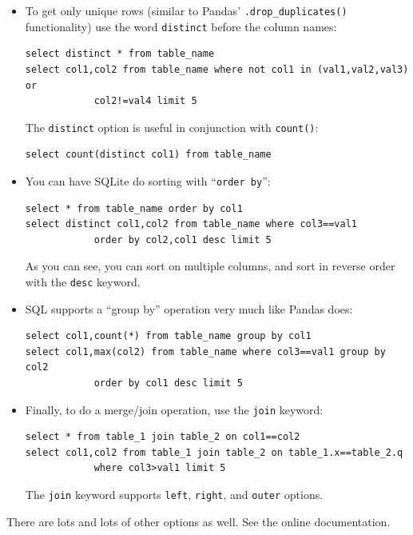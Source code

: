 \begin{itemize}
\item To get only unique rows (similar to Pandas' \texttt{.drop\_duplicates()}
functionality) use the word \texttt{distinct} before the column names:

\scriptsize
\begin{Verbatim}[fontsize=\footnotesize,samepage=true,frame=lines]
select distinct * from table_name
select col1,col2 from table_name where not col1 in (val1,val2,val3) or
            col2!=val4 limit 5
\end{Verbatim}
\normalsize

The \texttt{distinct} option is useful in conjunction with \texttt{count()}:
\scriptsize
\begin{Verbatim}[fontsize=\footnotesize,samepage=true,frame=lines]
select count(distinct col1) from table_name
\end{Verbatim}
\normalsize

\item You can have SQLite do sorting with ``\texttt{order by}'':
\scriptsize
\begin{Verbatim}[fontsize=\footnotesize,samepage=true,frame=lines]
select * from table_name order by col1
select distinct col1,col2 from table_name where col3==val1
            order by col2,col1 desc limit 5
\end{Verbatim}
\normalsize

As you can see, you can sort on multiple columns, and sort in reverse order
with the \texttt{desc} keyword.

\item SQL supports a ``group by'' operation very much like Pandas does:

\scriptsize
\begin{Verbatim}[fontsize=\footnotesize,samepage=true,frame=lines]
select col1,count(*) from table_name group by col1
select col1,max(col2) from table_name where col3==val1 group by col2
            order by col1 desc limit 5
\end{Verbatim}
\normalsize

\item Finally, to do a merge/join operation, use the \texttt{join} keyword:

\scriptsize
\begin{Verbatim}[fontsize=\footnotesize,samepage=true,frame=lines]
select * from table_1 join table_2 on col1==col2
select col1,col2 from table_1 join table_2 on table_1.x==table_2.q
            where col3>val1 limit 5
\end{Verbatim}
\normalsize

The \texttt{join} keyword supports \texttt{left}, \texttt{right}, and
\texttt{outer} options.

\end{itemize}

There are lots and lots of other options as well. See the online
documentation.

